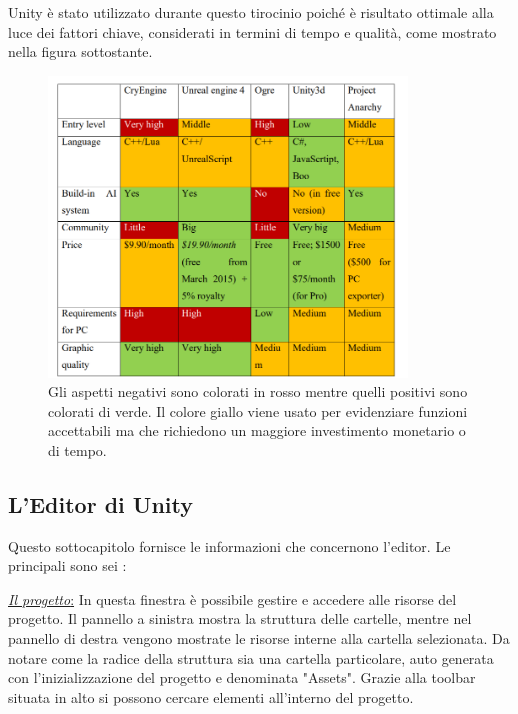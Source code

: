 \newpage
Unity è stato utilizzato durante questo tirocinio poiché è risultato ottimale alla luce dei fattori chiave, considerati in termini di tempo e qualità, come mostrato nella figura sottostante.
\begin{figure}[H]
	\includegraphics[width=0.85\textwidth]{figure/EngineComp}
	\centering
	\vspace{0.3cm}
\caption{Gli aspetti negativi sono colorati in rosso mentre quelli positivi sono colorati di verde. Il colore giallo viene usato per evidenziare funzioni accettabili ma che richiedono un maggiore investimento monetario o di tempo. \cite{ThesisUnity}}
\end{figure}

\newpage

\subsection{L'Editor di Unity}
Questo sottocapitolo fornisce le informazioni che concernono l'editor. Le principali sono sei \cite{UnityEditor}: 
\begin{flushleft}
	\underline{\textit{Il progetto}:}
	In questa finestra è possibile gestire e accedere alle risorse del progetto. Il pannello a sinistra mostra la struttura delle cartelle, mentre nel pannello di destra vengono mostrate le risorse interne alla cartella selezionata. Da notare come la radice della struttura sia una cartella particolare, auto generata con l'inizializzazione del progetto e denominata "Assets". Grazie alla toolbar situata in alto si possono cercare elementi all'interno del progetto.
\end{flushleft}

